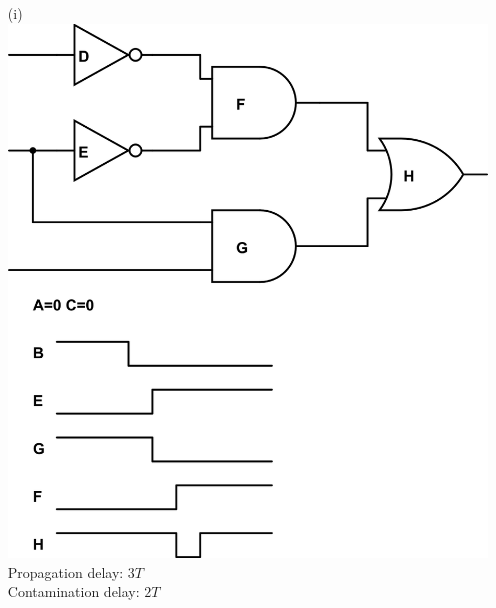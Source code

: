 \documentclass[10pt,twoside,a4paper]{article}
\begin{document}
\begin{enumerate}
\item[(i)]
\includegraphics[scale=0.8]{sv2-7-i.png} \\
Propagation delay: $3T$\\
Contamination delay: $2T$


\end{enumerate}
\end{document}
